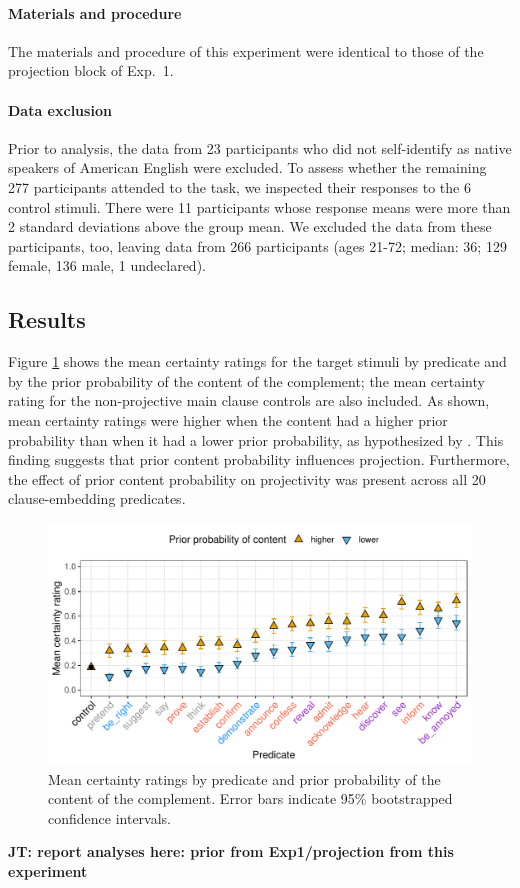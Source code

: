 \documentclass[11pt,fleqn]{article}
\newcommand{\6}{\mbox{$[\hspace*{-.6mm}[$}}
\newcommand{\9}{\mbox{$]\hspace*{-.6mm}]$}}
\newcommand{\jt}[1]{\textbf{\color{blue}JT: #1}}
\begin{document}
\paragraph{Materials and procedure} The materials and procedure of this experiment were identical to those of the projection block of Exp.~1. 

\paragraph{Data exclusion}
Prior to analysis, the data from 23 participants who did not self-identify as native speakers of American English were excluded. To assess whether the remaining 277 participants attended to the task, we inspected their responses to the 6 control stimuli. There were 11 participants whose response means were more than 2 standard deviations above the group mean. We excluded the data from these participants, too, leaving data from 266 participants (ages 21-72; median: 36; 129 female, 136 male, 1 undeclared).

\subsection{Results}

Figure \ref{f-projection2} shows the mean certainty ratings for the target stimuli by predicate and by the prior probability of the content of the complement; the mean certainty rating for the non-projective main clause controls are also included. As shown, mean certainty ratings were higher when the content had a higher prior probability than when it had a lower prior probability, as hypothesized by \citet{tbd-variability}. This finding suggests that prior content probability influences projection. Furthermore, the effect of prior content probability on projectivity was present across all 20 clause-embedding predicates.

\begin{figure}[H]
\centering

\includegraphics[width=.75\paperwidth]{../../results/3-projectivity/graphs/means-projectivity-by-predicate-and-facttype}

\caption{Mean certainty ratings by predicate and prior probability of the content of the complement. Error bars indicate 95\% bootstrapped confidence intervals.} 
\label{f-projection2}
\end{figure}

\jt{report analyses here: prior from Exp1/projection from this experiment}
\end{document}
